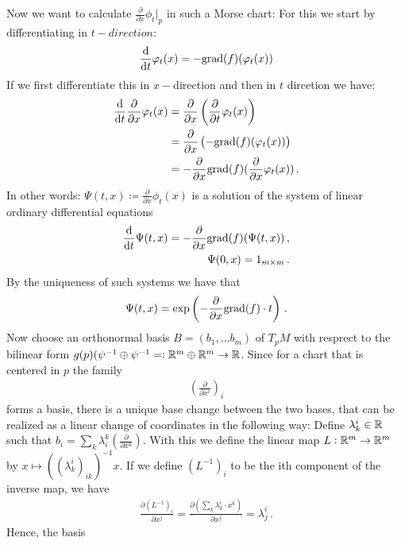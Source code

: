 Now we want to calculate $\frac{\partial}{\partial x} \phi_t \Big| _p$ in such a Morse chart:
For this we start by differentiating in $t-direction$:
\begin{align*}
    \frac{\mathop{}\!\mathrm{d}}{\mathop{}\!\mathrm{d} t}\varphi_t(x)=-\mathrm{grad}(f)(\varphi_t(x))
\end{align*} If we first differentiate this in $x-$direction and then in $t$ dircetion we have:
\begin{align*}
         \frac{\mathop{}\!\mathrm{d} }{\mathop{}\!\mathrm{d} t} \frac{\partial}{\partial x}\varphi_t(x)
    & =  \frac{\partial }{\partial x} \left( \frac{\partial}{\partial t}\varphi_t(x) \right)\\
    & =  \frac{\partial }{\partial x} \left( -\mathrm{grad}(f)(\varphi_t(x)) \right)         \\
    & = -\frac{\partial }{\partial x} \mathrm{grad}(f)(\frac{\partial }{\partial x}\varphi_t(x)) \, .
\end{align*}    In other words: $\Psi(t,x)\coloneq \frac{\partial}{\partial x}\phi_t(x)$ is a solution of the system of linear ordinary differential equations
\begin{align*}
    \frac{\mathop{}\!\mathrm{d}}{\mathop{}\!\mathrm{d} t}\Psi(t,x)=-\frac{\partial }{\partial x} \mathrm{grad}(f)(\Psi(t,x)) \, , \\
    \Psi(0,x)= 1_{m\times m} \, .
\end{align*} By the uniqueness of such systems we have that 
\begin{align*}
    \Psi(t,x)=\exp\left(-\frac{\partial}{\partial x}\mathrm{grad}(f)\cdot t\right) \,.
\end{align*} Now choose an orthonormal basis $B=(b_1,\dots b_m)$ of $T_pM$ with resprect to the bilinear form $g(p)(\psi^{-1}\oplus \psi^{-1}=:\mathbb{R}^m\oplus \mathbb{R}^m \to \mathbb{R}$. Since for a chart that is centered in $p$ the family 
\begin{align*}
    \left(\frac{\partial}{\partial x^i}\right)_i
\end{align*} forms a basis, there is a unique base change between the two bases, that can be realized as a linear change of coordinates in the following way:
Define $\lambda^i_k\in \mathbb{R}$ such that $b_i=\sum_k\lambda^k_i (\frac{\partial}{\partial x^k})$. With this we define the linear map $L:\mathbb{R}^m\to \mathbb{R}^m$ by $x\mapsto \left((\lambda ^i_k)_{ik}\right)^{-1}x$. If we define $(L^{-1})_i$ to be the ith component of the inverse map, we have
\begin{align*}
    \frac{\partial (L^{-1})_i}{\partial x^j}= \frac{\partial (\sum_k \lambda^i_k\cdot x^k)}{\partial x^j}= \lambda^i_j \, .
\end{align*}Hence, the basis 
